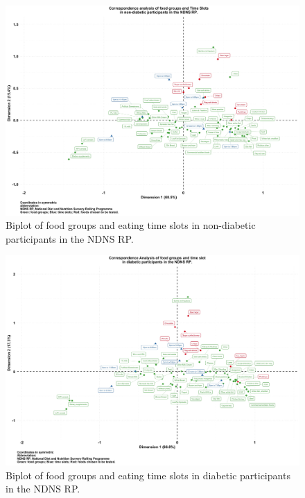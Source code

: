 \documentclass[utf8]{frontiersSCNS}
\providecommand{\DIFaddbeginFL}{} %
\providecommand{\DIFaddendFL}{} %
\providecommand{\DIFdelbeginFL}{} %
\providecommand{\DIFdelendFL}{} %
\newcommand{\DIFscaledelfig}{0.5}
\newlength{\DIFdelgraphicswidth} %
\newlength{\DIFdelgraphicsheight} %
\newcommand{\DIFaddincludegraphics}[2][]{{\color{blue}\fbox{\DIFOincludegraphics[#1]{#2}}}} %
\newcommand{\DIFdelincludegraphics}[2][]{%
\sbox{\DIFdelgraphicsbox}{\DIFOincludegraphics[#1]{#2}}%
\settoboxwidth{\DIFdelgraphicswidth}{\DIFdelgraphicsbox} %
\settoboxtotalheight{\DIFdelgraphicsheight}{\DIFdelgraphicsbox} %
\scalebox{\DIFscaledelfig}{%
\parbox[b]{\DIFdelgraphicswidth}{\usebox{\DIFdelgraphicsbox}\\[-\baselineskip] \rule{\DIFdelgraphicswidth}{0em}}\llap{\resizebox{\DIFdelgraphicswidth}{\DIFdelgraphicsheight}{%
\setlength{\unitlength}{\DIFdelgraphicswidth}%
\begin{picture}(1,1)%
\thicklines\linethickness{2pt} %
{\color[rgb]{1,0,0}\put(0,0){\framebox(1,1){}}}%
{\color[rgb]{1,0,0}\put(0,0){\line( 1,1){1}}}%
{\color[rgb]{1,0,0}\put(0,1){\line(1,-1){1}}}%
\end{picture}%
}\hspace*{3pt}}} %
} %
\DeclareRobustCommand{\DIFaddbeginFL}{\DIFOaddbeginFL \let\includegraphics\DIFaddincludegraphics} %
\DeclareRobustCommand{\DIFaddendFL}{\DIFOaddendFL \let\includegraphics\DIFOincludegraphics} %
\DeclareRobustCommand{\DIFdelbeginFL}{\DIFOdelbeginFL \let\includegraphics\DIFdelincludegraphics} %
\DeclareRobustCommand{\DIFdelendFL}{\DIFOaddendFL \let\includegraphics\DIFOincludegraphics} %
\begin{document}
\begin{landscape}
\begin{figure}[!ht]
\begin{center}
\DIFdelbeginFL %
\DIFdelendFL \DIFaddbeginFL \includegraphics[width=21.5cm]{Fig2_big.jpg}
\DIFaddendFL \end{center}
\caption{Biplot of food groups and eating time slots in non-diabetic participants in the NDNS RP.}\label{fig:fig2}
\end{figure}

\begin{figure}[!ht]
\begin{center}
\DIFdelbeginFL %
\DIFdelendFL \DIFaddbeginFL \includegraphics[width=21.5cm]{Fig3_big.jpg}
\DIFaddendFL \end{center}
\caption{Biplot of food groups and eating time slots in diabetic participants in the NDNS RP.}\label{fig:fig3}
\end{figure}


\end{landscape}
\end{document}

